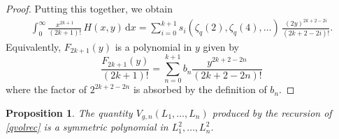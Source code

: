 \documentclass[a4paper]{article}
\theoremstyle{plain}
\newtheorem{proposition}[theorem]{Proposition}
\theoremstyle{definition}
\newcommand{\dd}{\mathrm{d}}
\begin{document}
\begin{proof}
Putting this together, we obtain
\begin{align*}
\int_0^\infty \!\! \frac{x^{2k+1}}{(2k+1)!} \, H(x,y) \, \dd x %
=\sum_{i=0}^{k+1} s_i ( \zeta_q(2), \zeta_q(4), \ldots) \, \frac{(2y)^{2k+2-2i}}{(2k+2-2i)!}.
\end{align*}
Equivalently, $F_{2k+1}(y)$ is a polynomial in $y$ given by
\[
\frac{F_{2k+1}(y)}{(2k+1)!}=\sum_{n=0}^{k+1} b_n\frac{y^{2k+2-2n}}{(2k+2-2n)!} 
\]
where the factor of $2^{2k+2-2n}$ is absorbed by the definition of $b_n$.
\end{proof}


\begin{proposition} \label{sym}
The quantity $V_{g,n}(L_1, \ldots, L_n)$ produced by the recursion of \cref{qvolrec} is a symmetric polynomial in $L_1^2, \ldots, L_n^2$.
\end{proposition}
\end{document}
